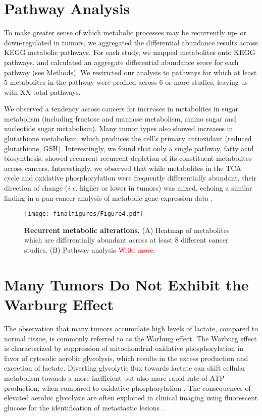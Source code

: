 \documentclass[10pt]{article}
\begin{document}
\section{Pathway Analysis}
To make greater sense of which metabolic processes may be recurrently up- or down-regulated in tumors, we aggregated the differential abundance results across KEGG metabolic pathways. For each study, we mapped metabolites onto KEGG pathways, and calculated an aggregate differential abundance score for each pathway (see Methods). We restricted our analysis to pathways for which at least 5 metabolites in the pathway were profiled across 6 or more studies, leaving us with XX total pathways. 

We observed a tendency across cancers for increases in metabolites in sugar metabolism (including fructose and mannose metabolism, amino sugar and nucleotide sugar metabolism). Many tumor types also showed increases in glutathione metabolism, which produces the cell's primary antioxidant (reduced glutathione, GSH). Interestingly, we found that only a single pathway, fatty acid biosynthesis, showed recurrent recurrent depletion of its constituent metabolites across cancers. Interestingly, we observed that while metabolites in the TCA cycle and oxidative phosphorylation were frequently differentially abundant, their direction of change (\textit{i.e.} higher or lower in tumors) was mixed, echoing a similar finding in a pan-cancer analysis of metabolic gene expression data \cite{Hu2013}.

\begin{figure}[ht!]
  \centering
     \texttt{[image: finalfigures/Figure4.pdf]}
  \caption{\textbf{Recurrent metabolic alterations.} (A) Heatmap of metabolites which are differentially abundant across at least 8 different cancer studies. (B) Pathway analysis \textcolor{red}{Write more.}}
     \label{fig:Fig4}
\end{figure}

\section{Many Tumors Do Not Exhibit the Warburg Effect}
The observation that many tumors accumulate high levels of lactate, compared to normal tissue, is commonly referred to as the Warburg effect. The Warburg effect is characterized by suppression of mitochondrial oxidative phosphorylation in favor of cytosolic aerobic glycolysis, which results in the excess production and excretion of lactate. Diverting glycolytic flux towards lactate can shift cellular metabolism towards a more inefficient but also more rapid rate of ATP production, when compared to oxidative phosphorylation \cite{VanderHeiden2009}. The consequences of elevated aerobic glycolysis are often exploited in clinical imaging using fluorescent glucose for the identification of metastastic lesions \cite{CITE}.
\end{document}
